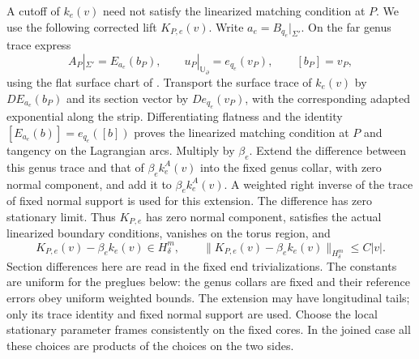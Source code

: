 \documentclass[11pt]{amsart}
\theoremstyle{definition}
\theoremstyle{remark}
\theoremstyle{plain}
\numberwithin{equation}{section}
\begin{document}
A cutoff of $k_e(v)$ need not satisfy the linearized matching
condition at $P$. We use the following corrected lift
$K_{P,e}(v)$. Write $a_e=B_{q_e}|_{\Sigma'}$. On the far genus
trace express
\[
 A_P|_{\Sigma'}=E_{a_e}(b_P),\qquad
 u_P|_{\mathbb U_\partial}=e_{q_e}(v_P),\qquad [b_P]=v_P,
\]
using the flat surface chart of \cite[Lemmas~4.1 and~4.4]{DFL}.
Transport the surface trace of $k_e(v)$ by $DE_{a_e}(b_P)$ and
its section vector by $De_{q_e}(v_P)$, with the corresponding
adapted exponential along the strip. Differentiating flatness
and the identity $[E_{a_e}(b)]=e_{q_e}([b])$ proves the linearized
matching condition at $P$ and tangency on the Lagrangian arcs.
Multiply by $\beta_e$. Extend the difference between this genus
trace and that of $\beta_e k_e^A(v)$ into the fixed genus collar,
with zero normal component, and add it to $\beta_e k_e^A(v)$.
A weighted right inverse of the trace of fixed normal support is
used for this extension. The difference has zero stationary limit.
Thus $K_{P,e}$ has zero normal component, satisfies the actual
linearized boundary conditions, vanishes on the torus region, and
\begin{equation}\label{eq:corrected-profile}
 K_{P,e}(v)-\beta_e k_e(v)\in H^m_\delta,\qquad
 \|K_{P,e}(v)-\beta_e k_e(v)\|_{H^m_\delta}\le C|v|.
\end{equation}
Section differences here are read in the fixed end trivializations.
The constants are uniform for the preglues below: the genus collars
are fixed and their reference errors obey uniform weighted bounds.
The extension may have longitudinal tails; only its trace identity
and fixed normal support are used. Choose the local stationary
parameter frames consistently on the fixed cores. In the joined
case all these choices are products of the choices on the two sides.
\end{document}
